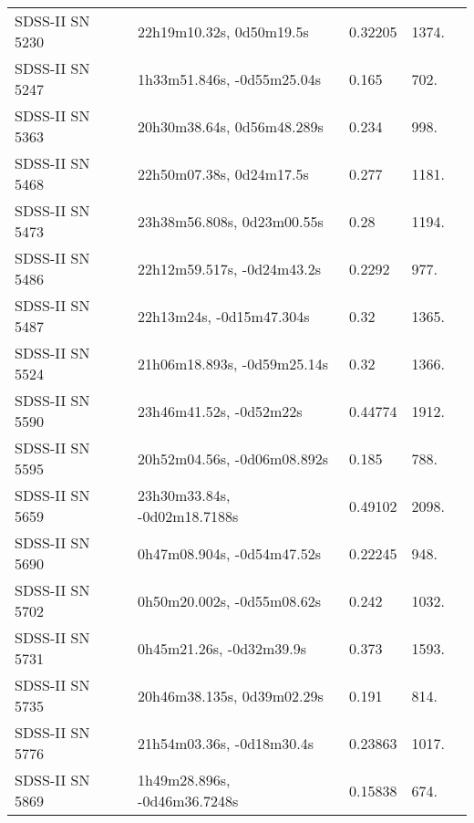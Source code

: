 \begin{longtable}{lllll}
  SDSS-II SN 5230 &       22h19m10.32s, 0d50m19.5s &  0.32205 &          1374. &    \citet{2016SDSSD.C...0000:} \\
  SDSS-II SN 5247 &     1h33m51.846s, -0d55m25.04s &    0.165 &           702. &    \citet{2011ApJ...738..162S} \\
  SDSS-II SN 5363 &     20h30m38.64s, 0d56m48.289s &    0.234 &           998. &    \citet{2011ApJ...738..162S} \\
  SDSS-II SN 5468 &       22h50m07.38s, 0d24m17.5s &    0.277 &          1181. &    \citet{2010ApJ...713.1026D} \\
  SDSS-II SN 5473 &     23h38m56.808s, 0d23m00.55s &     0.28 &          1194. &    \citet{2011ApJ...738..162S} \\
  SDSS-II SN 5486 &     22h12m59.517s, -0d24m43.2s &   0.2292 &           977. &    \citet{2011ApJ...738..162S} \\
  SDSS-II SN 5487 &       22h13m24s, -0d15m47.304s &     0.32 &          1365. &    \citet{2011ApJ...738..162S} \\
  SDSS-II SN 5524 &    21h06m18.893s, -0d59m25.14s &     0.32 &          1366. &    \citet{2011ApJ...738..162S} \\
  SDSS-II SN 5590 &        23h46m41.52s, -0d52m22s &  0.44774 &          1912. &    \citet{2016SDSSD.C...0000:} \\
  SDSS-II SN 5595 &    20h52m04.56s, -0d06m08.892s &    0.185 &           788. &    \citet{2011ApJ...738..162S} \\
  SDSS-II SN 5659 &   23h30m33.84s, -0d02m18.7188s &  0.49102 &          2098. &    \citet{2016SDSSD.C...0000:} \\
  SDSS-II SN 5690 &     0h47m08.904s, -0d54m47.52s &  0.22245 &           948. &    \citet{2016SDSSD.C...0000:} \\
  SDSS-II SN 5702 &     0h50m20.002s, -0d55m08.62s &    0.242 &          1032. &    \citet{2011ApJ...738..162S} \\
  SDSS-II SN 5731 &       0h45m21.26s, -0d32m39.9s &    0.373 &          1593. &    \citet{2011ApJ...738..162S} \\
  SDSS-II SN 5735 &     20h46m38.135s, 0d39m02.29s &    0.191 &           814. &    \citet{2011ApJ...738..162S} \\
  SDSS-II SN 5776 &      21h54m03.36s, -0d18m30.4s &  0.23863 &          1017. &    \citet{2016SDSSD.C...0000:} \\
  SDSS-II SN 5869 &   1h49m28.896s, -0d46m36.7248s &  0.15838 &           674. &    \citet{2016SDSSD.C...0000:} \\

\end{longtable}
